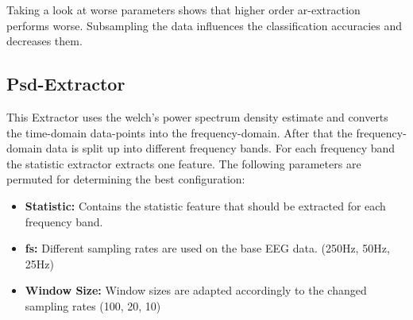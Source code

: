 \documentclass{article}
\begin{document}
Taking a look at worse parameters shows that higher order ar-extraction performs worse. Subsampling the data influences the classification accuracies and decreases them.

\subsection{Psd-Extractor}

This Extractor uses the welch's power spectrum density estimate and converts the time-domain data-points into the frequency-domain. After that the frequency-domain data is split up into different frequency bands. For each frequency band the statistic extractor extracts one feature. The following parameters are permuted for determining the best configuration:
\begin{itemize}
    \item \textbf{Statistic:} Contains the statistic feature that should be extracted for each frequency band.
    \item \textbf{fs:} Different sampling rates are used on the base EEG data. (250Hz, 50Hz, 25Hz)
    \item \textbf{Window Size:} Window sizes are adapted accordingly to the changed sampling rates (100, 20, 10)
\end{itemize}
\end{document}
